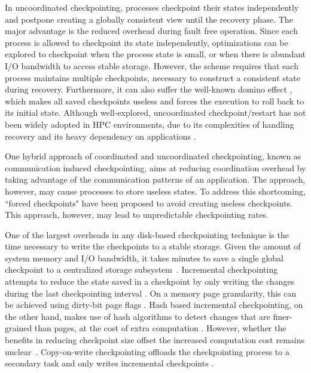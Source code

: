In uncoordinated checkpointing, processes checkpoint their states independently and postpone creating a 
globally consistent view until the recovery phase. The major advantage is the reduced overhead during fault free operation. Since each process is allowed to checkpoint its state independently, optimizations can be explored to checkpoint when the process state is small, or when there is abundant I/O bandwidth to access stable storage.
However, the scheme requires that
each process maintains multiple checkpoints, necessary to construct a consistent state during recovery. Furthermore, it can also suffer the well-known domino effect 
 \cite{randell_domino_effect,alvisi_ftc_1999,helary_rds_1997}, which makes all saved checkpoints useless and forces the execution to roll back to its initial state. 
Although well-explored, uncoordinated checkpoint/restart has not been widely adopted
in HPC environments, due to its complexities of handling recovery and its heavy dependency on applications \cite{Elnozahy:02:Survey,guermouche_2011_ipdps}. 
 
One hybrid approach of coordinated and uncoordinated checkpointing, known as communication induced 
checkpointing, aims at reducing coordination overhead by taking advantage of the communication patterns of an application\cite{alvisi_ftc_1999}. The approach, however, may 
cause processes to store useless states. To address this 
shortcoming, ``forced checkpoints" have been proposed \cite{helary_rds_1997} to avoid creating useless checkpoints. This approach, however,  may lead to unpredictable checkpointing rates. 

One of the largest overheads in any disk-based checkpointing technique is the time necessary to write the checkpoints
to a stable storage. Given the amount of system memory and I/O bandwidth, it takes minutes to save a single global checkpoint to a centralized storage subsystem~\cite{mills2014power}.  
Incremental checkpointing attempts
to reduce the state saved in a checkpoint by only writing the changes during the last checkpointing interval \cite{Agarwal:04:Adaptive,elnozahy_1992_manetho,li_trans_1994}. 
On a memory page granularity, this can be achieved using dirty-bit page flags \cite{plank_ftcs_1994,elnozahy_1992_manetho}. Hash based incremental checkpointing, on the other hand, makes use of hash algorithms to detect changes that are finer-grained than pages, at the cost of extra computation \cite{nam_ftc_1997,Agarwal:04:Adaptive}. However, whether the benefits in reducing checkpoint size offset the increased computation cost remains unclear~\cite{elnozahy1998safe,nam2002probabilistic}. 
Copy-on-write checkpointing offloads the checkpointing process to a secondary task and only writes incremental checkpoints \cite{li_trans_1994}.

